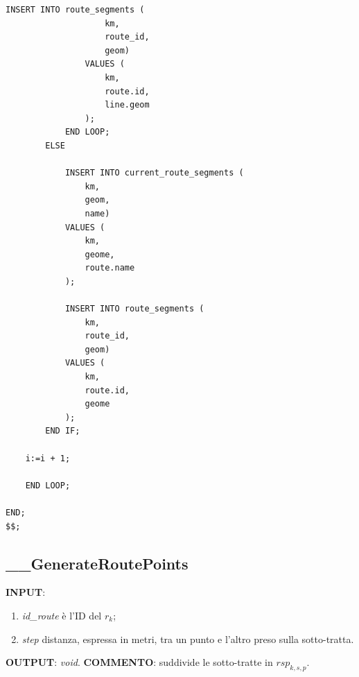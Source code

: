 \begin{lstlisting}[style = mystyle]
				INSERT INTO route_segments (
					km,
					route_id,
					geom) 
				VALUES (
					km,
					route.id,
					line.geom
				);
			END LOOP;
		ELSE
		
			INSERT INTO current_route_segments (
				km, 
				geom, 
				name) 
			VALUES (
				km, 
				geome, 
				route.name
			);
			
			INSERT INTO route_segments (
				km,
				route_id,
				geom) 
			VALUES (
				km,
				route.id,
				geome
			);
		END IF;

	i:=i + 1;
	
	END LOOP;

END;
$$;

\end{lstlisting}

\subsection{\_\_GenerateRoutePoints}

\textbf{INPUT}: 
\begin{enumerate}
	\item \textit{id\_route} è l'ID del $r_k$;
	\item \textit{step} distanza, espressa in metri, tra un punto e l'altro preso sulla sotto-tratta. 
\end{enumerate}
\textbf{OUTPUT}: \textit{void}. \newline
\textbf{COMMENTO}: suddivide le sotto-tratte in $rsp_{k, s, p}$.

